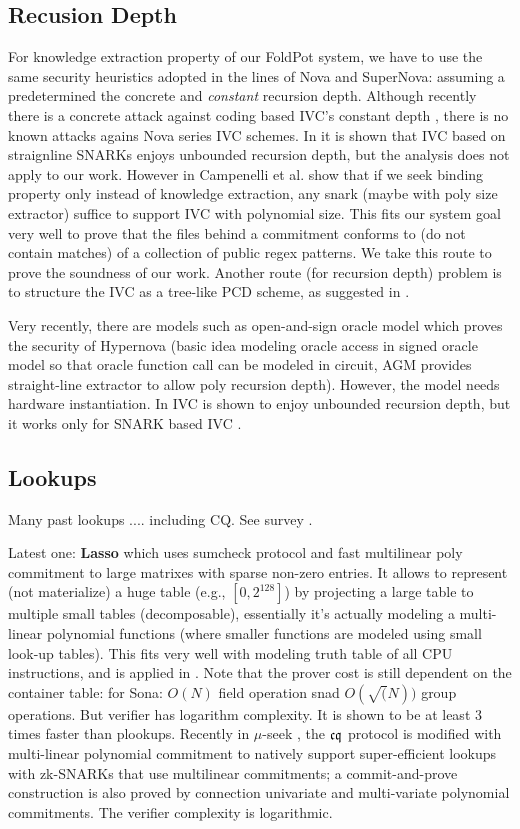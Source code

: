 \subsection{Recusion Depth}
For knowledge extraction property of our FoldPot system, we have
to use the same security heuristics adopted in the lines of
Nova and SuperNova: assuming a predetermined the concrete 
and {\em constant} recursion depth. 
Although recently there is a 
concrete attack against coding based IVC's constant depth 
\cite{bmnw24},
there is no known attacks
agains Nova series IVC schemes.  
In \cite{Guan24} it is shown that IVC based on straignline 
SNARKs enjoys unbounded recursion depth, but the analysis does not
apply to our work.
However in \cite{Campanelli25} Campenelli et al. show that
if we seek binding property only instead of knowledge extraction,
any snark (maybe with poly size extractor) suffice to support
IVC with polynomial size. This fits our system goal very well
to prove that the files behind a commitment conforms to (do not
contain matches) of a collection of public regex patterns.
We take this route to prove the soundness of our work.
Another route (for recursion depth) problem is to structure
the IVC as a tree-like PCD scheme, as suggested in
\cite{ct10}.

Very recently, there are models such as open-and-sign oracle model
\cite{maller25ivc} which proves the security of Hypernova
(basic idea modeling oracle access in signed oracle model
so that oracle function call can be modeled in circuit,
AGM provides straight-line extractor to allow poly recursion depth).
However, the model needs hardware instantiation.
In \cite{Guan24,CFP25,CFP25b} IVC is shown to enjoy unbounded
recursion depth, but it works only for SNARK based IVC
\cite{BCCT13}.



\subsection{Lookups}
Many past lookups .... including CQ. See survey \cite{soklkup}.


Latest one: {\bf Lasso} \cite{Lasso} which uses sumcheck protocol
and fast multilinear poly commitment to large matrixes with sparse
non-zero entries. It allows to represent (not materialize) a huge
table (e.g., $[0, 2^{128}]$) by projecting a large table to
multiple small tables (decomposable), essentially it's actually
modeling a multi-linear polynomial functions (where smaller functions
are modeled using small look-up tables). This fits very well with
modeling truth table of all CPU instructions, and is applied in
\cite{Jolt}. Note that the prover cost is still dependent
on the container table: for Sona: $O(N)$ field operation snad
$O(\sqrt(N))$ group operations. But verifier has logarithm complexity.
It is shown to be at least 3 times faster than
plookups.  Recently in $\mu$-seek \cite{useek}, the ${\mathfrak{cq}}$ protocol
is modified with multi-linear polynomial commitment to natively
support super-efficient lookups with zk-SNARKs that use 
multilinear commitments; a commit-and-prove construction is
also proved by connection univariate and multi-variate polynomial
commitments. The verifier complexity is logarithmic.


